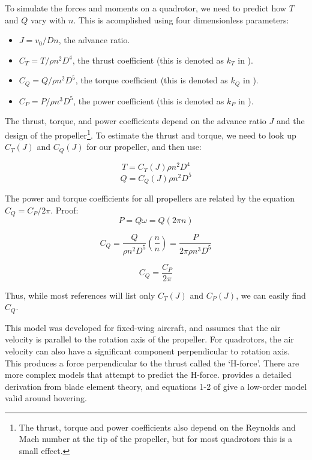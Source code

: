 \documentclass[12pt]{article}
\begin{document}
To simulate the forces and moments on a quadrotor, we need to predict how $T$ and $Q$ vary with $n$. This is acomplished using four dimensionless parameters:

\begin{itemize}
    \item $J = v_0 / D n$, the advance ratio.
    \item $C_T = T / \rho n^2 D^4$, the thrust coefficient (this is denoted as $k_T$ in \cite{Unified}).
    \item $C_Q = Q / \rho n^2 D^5$, the torque coefficient (this is denoted as $k_Q$ in \cite{Unified}).
    \item $C_P = P / \rho n^3 D^5$, the power coefficient (this is denoted as $k_P$ in \cite{Unified}).
\end{itemize}

The thrust, torque, and power coefficients depend on the advance ratio $J$ and the design of the propeller\footnote{The thrust, torque and power coefficients also depend on the Reynolds and Mach number at the tip of the propeller, but for most quadrotors this is a small effect.}. To estimate the thrust and torque, we need to look up $C_T(J)$ and $C_Q(J)$ for our propeller, and then use:

\begin{equation}
    T = C_T(J) \rho n^2 D^4
\end{equation}
\begin{equation}
    Q = C_Q(J) \rho n^2 D^5
\end{equation}


The power and torque coefficients for all propellers are related by the equation $C_Q = C_P / 2 \pi$. Proof:
\[
P = Q \omega = Q (2 \pi n)
\]

\[
C_Q = \frac{Q}{\rho n^2 D^5} \left( \frac{n}{n} \right) = \frac{P}{2 \pi \rho n^3 D^5}
\]

\begin{equation}
C_Q =  \frac{C_P}{2 \pi}
\end{equation}

Thus, while most references will list only $C_T(J)$ and $C_P(J)$, we can easily find $C_Q$.

This model was developed for fixed-wing aircraft, and assumes that the air velocity is parallel to the rotation axis of the propeller. For quadrotors, the air velocity can also have a significant component perpendicular to rotation axis. This produces a force perpendicular to the thrust called the `H-force'. There are more complex models that attempt to predict the H-force. \cite{2016arXiv160100733B} provides a detailed derivation from blade element theory, and equations 1-2 of \cite{martin:hal-00422423} give a low-order model valid around hovering.
\end{document}
